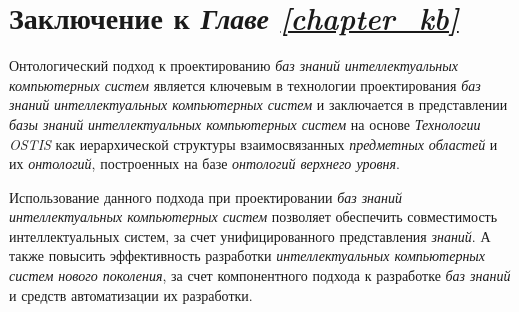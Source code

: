 \section*{Заключение к \textit{Главе \ref{chapter_kb}}}

Онтологический подход к проектированию \textit{баз знаний} \textit{интеллектуальных компьютерных систем} является ключевым в технологии проектирования \textit{баз знаний} \textit{интеллектуальных компьютерных систем} и заключается в представлении \textit{базы знаний} \textit{интеллектуальных компьютерных систем} на основе \textit{Технологии OSTIS} как иерархической структуры взаимосвязанных \textit{предметных областей} и их \textit{онтологий}, построенных на базе \textit{онтологий верхнего уровня}.

Использование данного подхода при проектировании \textit{баз знаний} \textit{интеллектуальных компьютерных систем} позволяет обеспечить совместимость интеллектуальных систем, за счет унифицированного представления \textit{знаний}. А также повысить эффективность разработки \textit{интеллектуальных компьютерных систем нового поколения}, за счет компонентного подхода к разработке \textit{баз знаний} и средств автоматизации их разработки.

%